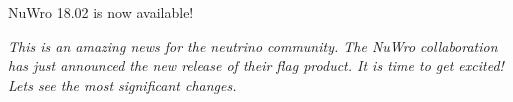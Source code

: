 \documentclass{article}
\date{FEBRUARY 26, 2018}
\begin{document}
\maketitle

\begin{center}
  {\vspace{5pt}\sc\huge NuWro 18.02 is now available!\vspace{5pt}}
\end{center}

\closearticle

{\Large\it This is an amazing news for the neutrino community. The NuWro collaboration has just announced the new release of their flag product. It is time to get excited! Lets see the most significant changes.}

\closearticle

\vspace{5pt}
\end{document}
